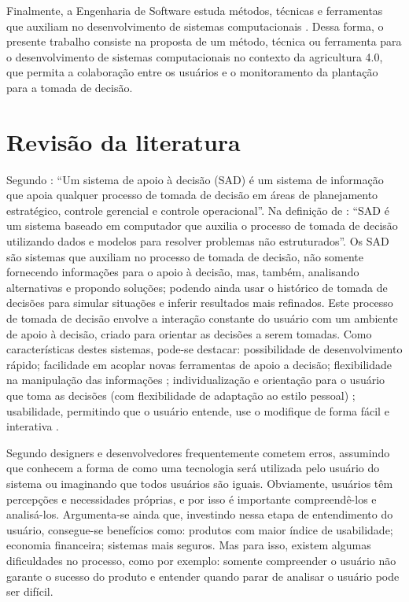 \documentclass[12pt]{article}
\begin{document}
Finalmente, a Engenharia de Software estuda métodos, técnicas e ferramentas que auxiliam no desenvolvimento de sistemas computacionais \cite{Sommerville:2011}. Dessa forma, o presente trabalho consiste na proposta de um método, técnica ou ferramenta para o desenvolvimento de sistemas computacionais no contexto da agricultura 4.0, que permita a colaboração entre os usuários e o monitoramento da plantação para a tomada de decisão.

\section{Revisão da literatura}
\label{sec:revisao_literatura}

Segundo : ``Um sistema de apoio à decisão (SAD) é um sistema de informação que apoia qualquer processo de tomada de decisão em áreas de planejamento estratégico, controle gerencial e controle operacional''. Na definição de : ``SAD é um sistema baseado em computador que auxilia o processo de tomada de decisão utilizando dados e modelos para resolver problemas não estruturados''. Os SAD são sistemas que auxiliam no processo de tomada de decisão, não somente fornecendo informações para o apoio à decisão, mas, também, analisando alternativas e propondo soluções; podendo ainda usar o histórico de tomada de decisões para simular situações e inferir resultados mais refinados. Este processo de tomada de decisão envolve a interação constante do usuário com um ambiente de apoio à decisão, criado para orientar as decisões a serem tomadas. Como características destes sistemas, pode-se destacar: possibilidade de desenvolvimento rápido; facilidade em acoplar novas ferramentas de apoio a decisão; flexibilidade na manipulação das informações \cite{John:1989}; individualização e orientação para o usuário que toma as decisões (com flexibilidade de adaptação ao estilo pessoal) \cite{Mittra:1986}; usabilidade, permitindo que o usuário entende, use o modifique de forma fácil e interativa \cite{Awad:1988}.

Segundo  designers e desenvolvedores frequentemente cometem erros, assumindo que conhecem a forma de como uma tecnologia será utilizada pelo usuário do sistema ou imaginando que todos usuários são iguais. Obviamente, usuários têm percepções e necessidades próprias, e por isso é importante compreendê-los e analisá-los. Argumenta-se ainda que, investindo nessa etapa de entendimento do usuário, consegue-se benefícios como: produtos com maior índice de usabilidade; economia financeira; sistemas mais seguros. Mas para isso, existem algumas dificuldades no processo, como por exemplo: somente compreender o usuário não garante o sucesso do produto e entender quando parar de analisar o usuário pode ser difícil.
\end{document}
